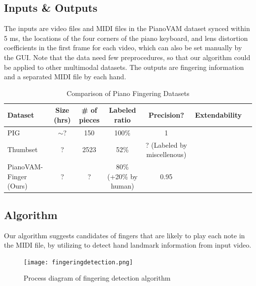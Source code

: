 \documentclass{article}
\newcommand{\cmark}{\ding{51}}%
\newcommand{\xmark}{\ding{55}}%
\begin{document}
\subsection{Inputs \& Outputs}
The inputs are video files and MIDI files in the PianoVAM dataset synced within 5 ms, the locations of the four corners of the piano keyboard, and lens distortion coefficients in the first frame for each video, which can also be set manually by the GUI. Note that the data need few preprocedures, so that our algorithm could be applied to other multimodal datasets.
The outputs are fingering information and a separated MIDI file by each hand.


\begin{table}[htbp]
    \centering
    \caption{Comparison of Piano Fingering Datasets}
    \small
    \begin{tabular}{lcccccc}
        \toprule
        \textbf{Dataset}  & \textbf{Size (hrs)} & \textbf{\# of pieces} & \textbf{Labeled ratio} & \textbf{Precision?} & \textbf{Extendability} \\
        \midrule
        PIG \cite{InfoSci20Nakamura} & $\sim$? & 150 & 100\% & 1 & \xmark \\
        Thumbset \cite{} & ? & 2523 & 52\%  & ? (Labeled by miscellenous) & \xmark \\
        PianoVAM-Finger (Ours) & ? & ? & 80\% (+20\% by human) & 0.95 & \cmark \\
        \bottomrule
    \end{tabular}
    \label{tab:alrogithm}
\end{table}

\subsection{Algorithm}
% 
Our algorithm suggests candidates of fingers that are likely to play each note in the MIDI file, by utilizing \cite{arXiv20Zhang} to detect hand landmark information from input video.
\begin{figure}
    \centering
    \texttt{[image: fingeringdetection.png]}\hspace*{0cm}
    \caption{Process diagram of fingering detection algorithm}
    \label{fig:enter-label}
\end{figure}
\end{document}
